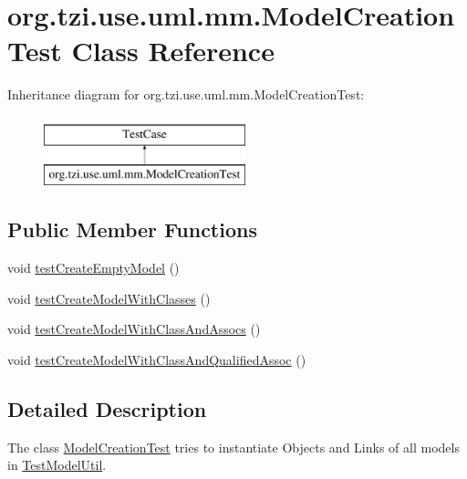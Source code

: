 \hypertarget{classorg_1_1tzi_1_1use_1_1uml_1_1mm_1_1_model_creation_test}{\section{org.\-tzi.\-use.\-uml.\-mm.\-Model\-Creation\-Test Class Reference}
\label{classorg_1_1tzi_1_1use_1_1uml_1_1mm_1_1_model_creation_test}
}
Inheritance diagram for org.\-tzi.\-use.\-uml.\-mm.\-Model\-Creation\-Test\-:\begin{figure}[H]
\begin{center}
\leavevmode
\includegraphics[height=2.000000cm]{classorg_1_1tzi_1_1use_1_1uml_1_1mm_1_1_model_creation_test}
\end{center}
\end{figure}
\subsection*{Public Member Functions}
\begin{DoxyCompactItemize}
\item 
void \hyperlink{classorg_1_1tzi_1_1use_1_1uml_1_1mm_1_1_model_creation_test_a37a9e44b21125b842a123f0308d186cb}{test\-Create\-Empty\-Model} ()
\item 
void \hyperlink{classorg_1_1tzi_1_1use_1_1uml_1_1mm_1_1_model_creation_test_a226a58962e0e170daca71b6fcdde194c}{test\-Create\-Model\-With\-Classes} ()
\item 
void \hyperlink{classorg_1_1tzi_1_1use_1_1uml_1_1mm_1_1_model_creation_test_a628a08a838fff0cea190358e40ed764f}{test\-Create\-Model\-With\-Class\-And\-Assocs} ()
\item 
void \hyperlink{classorg_1_1tzi_1_1use_1_1uml_1_1mm_1_1_model_creation_test_a52fda13fd8adf9869ccac9280b15272d}{test\-Create\-Model\-With\-Class\-And\-Qualified\-Assoc} ()
\end{DoxyCompactItemize}


\subsection{Detailed Description}
The class {\ttfamily \hyperlink{classorg_1_1tzi_1_1use_1_1uml_1_1mm_1_1_model_creation_test}{Model\-Creation\-Test}} tries to instantiate Objects and Links of all models in {\ttfamily \hyperlink{classorg_1_1tzi_1_1use_1_1uml_1_1mm_1_1_test_model_util}{Test\-Model\-Util}}.

